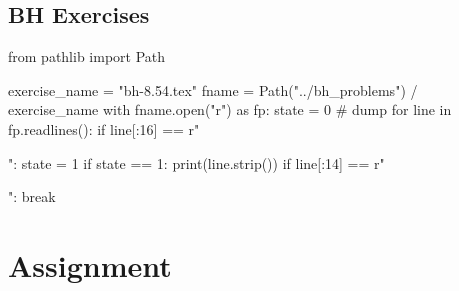 \subsection{BH Exercises}
\label{sec:bh-exercises-1}



\begin{pycode}
from pathlib import Path

exercise_name = "bh-8.54.tex"
fname = Path("../bh_problems") / exercise_name
with fname.open("r") as fp:
    state = 0  # dump
    for line in fp.readlines():
        if line[:16] == r"\begin{exercise}":
            state = 1
        if state == 1:
            print(line.strip())
        if line[:14] == r"\end{exercise}":
            break
\end{pycode}







\section{Assignment}
\label{sec:assignment}







